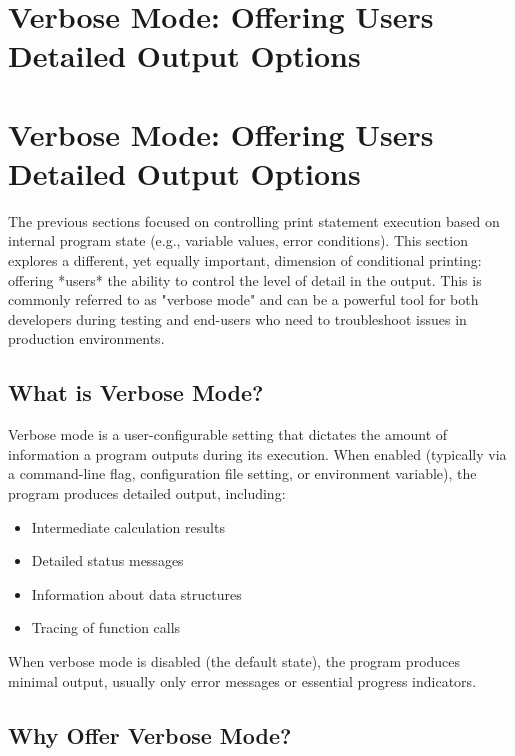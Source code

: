\documentclass{article}
\begin{document}
{{{%
\newpage

\section*{Verbose Mode: Offering Users Detailed Output Options} %
\label{chapter-5-4-Verbose_Mode__Offering_Users_Detailed_Ou}

\section*{Verbose Mode: Offering Users Detailed Output Options}

The previous sections focused on controlling print statement execution based on internal program state (e.g., variable values, error conditions).  This section explores a different, yet equally important, dimension of conditional printing: offering *users* the ability to control the level of detail in the output.  This is commonly referred to as "verbose mode" and can be a powerful tool for both developers during testing and end-users who need to troubleshoot issues in production environments.

\subsection*{What is Verbose Mode?}

Verbose mode is a user-configurable setting that dictates the amount of information a program outputs during its execution. When enabled (typically via a command-line flag, configuration file setting, or environment variable), the program produces detailed output, including:

\begin{itemize}
    \item Intermediate calculation results
    \item Detailed status messages
    \item Information about data structures
    \item Tracing of function calls
\end{itemize}

When verbose mode is disabled (the default state), the program produces minimal output, usually only error messages or essential progress indicators.

\subsection*{Why Offer Verbose Mode?}

}}}
\end{document}
